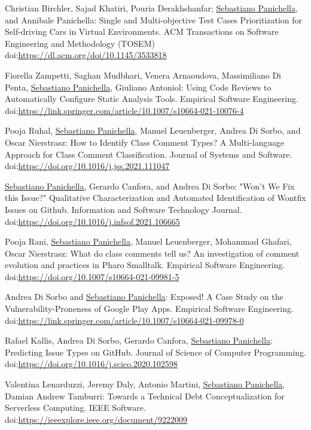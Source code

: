 \documentclass[10pt]{article}
\newcommand\doilink[1]{\href{http://dx.doi.org/#1}{#1}}
\newcommand\doi[1]{doi:\doilink{#1}}
\begin{document}
\begin{bibenum}
\item \label{J17} Christian Birchler, Sajad Khatiri, Pouria Derakhshanfar; \underline{Sebastiano Panichella}, and Annibale Panichella: Single and Multi-objective Test Cases Prioritization for Self-driving Cars in Virtual Environments.    ACM Transactions on Software Engineering and Methodology (TOSEM) \doi{https://dl.acm.org/doi/10.1145/3533818} 
\item \label{J16} Fiorella Zampetti, Saghan Mudbhari, Venera Arnaoudova, Massimiliano Di Penta, \underline{Sebastiano Panichella}, Giuliano Antoniol: Using Code Reviews to Automatically Configure Static Analysis Tools.    Empirical Software Engineering.  \\ \doi{https://link.springer.com/article/10.1007/s10664-021-10076-4} 
\item \label{J15} Pooja Ruhal, \underline{Sebastiano Panichella}, Manuel Leuenberger, Andrea Di Sorbo, and Oscar Nierstrasz: How to Identify Class Comment Types? A Multi-language Approach for Class Comment Classification. Journal of Systems and Software.  \doi{https://doi.org/10.1016/j.jss.2021.111047}
\item \label{J14} \underline{Sebastiano Panichella}, Gerardo Canfora, and Andrea Di Sorbo: "Won't We Fix this Issue?" Qualitative Characterization and Automated Identification of Wontfix Issues on Github. Information and Software Technology Journal. \\ \doi{https://doi.org/10.1016/j.infsof.2021.106665} 
\item \label{J13}  Pooja Rani, \underline{Sebastiano Panichella}, Manuel Leuenberger, Mohammad Ghafari, Oscar Nierstrasz: What do class comments tell us? An investigation of comment evolution and practices in Pharo Smalltalk. Empirical Software Engineering. \\ \doi{https://doi.org/10.1007/s10664-021-09981-5} 
\item \label{J12}  Andrea Di Sorbo and \underline{Sebastiano Panichella}: Exposed! A Case Study on the Vulnerability-Proneness of Google Play Apps.    Empirical Software Engineering. \\ \doi{https://link.springer.com/article/10.1007/s10664-021-09978-0} 
\item \label{J11}  Rafael Kallis, Andrea Di Sorbo, Gerardo Canfora, \underline{Sebastiano Panichella}: Predicting Issue Types on GitHub.  Journal of Science of Computer Programming.   \\ \doi{https://doi.org/10.1016/j.scico.2020.102598} 
\item \label{J10}   Valentina Lenarduzzi, Jeremy Daly, Antonio Martini, \underline{Sebastiano Panichella}, Damian Andrew Tamburri: Towards a Technical Debt Conceptualization for Serverless Computing.   IEEE Software.   \\ \doi{https://ieeexplore.ieee.org/document/9222009} 

\end{bibenum}
\end{document}
